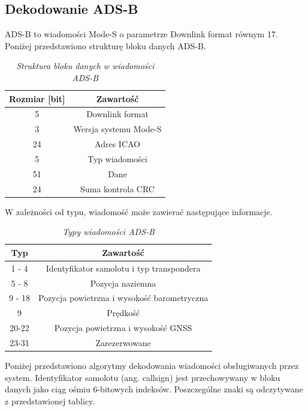 \documentclass[eng,printmode]{mgr}
\begin{document}
\subsection*{Dekodowanie ADS-B}
ADS-B to wiadomości Mode-S o parametrze Downlink format równym 17. Poniżej przedstawiono strukturę bloku danych ADS-B.

\begin{table}[htb]
\def\arraystretch{1.3}%
\caption{\textit{ Struktura bloku danych w wiadomości ADS-B}}
\label{tab:adsbFrame}
\begin{center}
\begin{tabular}{ |c|c| }
\hline
Rozmiar [bit] & Zawartość\\
\hline
5 & Downlink format\\
\hline
3 & Wersja systemu Mode-S\\
\hline
24 & Adres ICAO\\
\hline
5 & Typ wiadomości\\
\hline
51 & Dane\\
\hline
24 & Suma kontrola CRC\\
\hline
\end{tabular}
\end{center}
\end{table}
\noindent
W zależności od typu, wiadomość może zawierać następujące informacje.

\begin{table}[htb]
\def\arraystretch{1.3}%
\caption{\textit{ Typy wiadomości ADS-B}}
\label{tab:adsbTypes}
\begin{center}
\begin{tabular}{ |c|c| }
\hline
Typ & Zawartość\\
\hline
1 - 4 & Identyfikator samolotu i typ transpondera\\
\hline
5 - 8 & Pozycja naziemna\\
\hline
9 - 18 &  Pozycja powietrzna i wysokość barometryczna\\
\hline
9 & Prędkość\\
\hline
20-22 &  Pozycja powietrzna i wysokość GNSS\\
\hline
23-31 & Zarezerwowane\\
\hline
\end{tabular}
\end{center}
\end{table}

\newpage
Poniżej przedstawiono algorytmy dekodowania wiadomości obsługiwanych przez system.
\vskip 0.5cm
Identyfikator samolotu (ang. callsign) jest przechowywany w bloku danych jako ciąg ośmiu 6-bitowych indeksów. Poszczególne znaki są odczytywane z przedstawionej tablicy.
\end{document}

